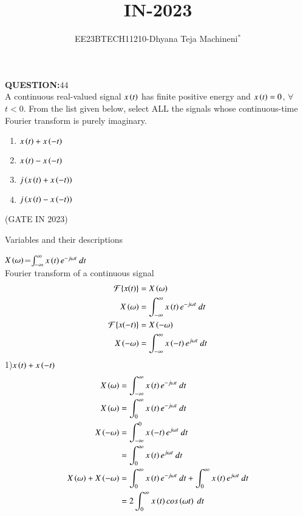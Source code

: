 \documentclass[journal,12pt,twocolumn]{IEEEtran}
\theoremstyle{remark}
\begin{document}

\vspace{3cm}
\title{\textbf{IN-2023}}
\author{EE23BTECH11210-Dhyana Teja Machineni$^{*}$%
}
\maketitle
\newpage
\bigskip

\textbf{QUESTION:$44$}\\
A continuous real-valued signal $x\left(t\right)$ has finite positive energy and $x\left(t\right) = 0$, $\forall$ $t < 0$. From the list given below, select ALL the signals whose
continuous-time Fourier transform is purely imaginary.\\
\begin{enumerate}
\item$x\left(t\right) + x\left(-t\right)$
\item$x\left(t\right) - x\left(-t\right)$
\item$j\left(x\left(t\right) + x\left(-t\right)\right)$
\item$j\left(x\left(t\right) - x\left(-t\right)\right)$
\end{enumerate}
\hfill{(GATE IN 2023)}\\
\solution
\begin{table}[h]
         \label{tab:table}
         
         \caption{Variables and their descriptions}
     \end{table}
$X\left(\omega\right)$=$\int_{-\infty}^{\infty} x\brak{t} e^{-j \omega t} \ dt$\\
Fourier transform of a continuous signal
\begin{align}
\mathcal{F}\{x(t)\} &= X\left(\omega\right)\\
   X\left(\omega\right)&=\int_{-\infty}^{\infty} x\left(t\right) e^{-j \omega t} \ dt\\
\mathcal{F}\{x(-t)\} &= X\left(-\omega \right)\\
   X\left(-\omega\right)&=\int_{-\infty}^{\infty} x\left(-t\right) e^{j \omega t} \ dt\\
\end{align}    
1)$x\left(t\right) + x\left(-t\right)$
\begin{align}
   X\brak{\omega}&=\int_{-\infty}^{\infty}x\brak{t} e^{-j \omega t} \ dt\\
   X\brak{\omega}&= \int_{0}^{\infty}x\brak{t} e^{-j \omega t} \ dt\\
   X\brak{-\omega}&= \int_{-\infty}^{0}x\brak{-t} e^{j \omega t} \ dt\\
 &=\int_{0}^{\infty}x\brak{t} e^{j\omega t} \ dt\\
 X\brak{\omega}+X\brak{-\omega}&= \int_{0}^{\infty}x\brak{t} e^{-j \omega t} \ dt+\int_{0}^{\infty}x\brak{t} e^{j \omega t} \ dt\\
 &=2 \int_{0}^{\infty} x\brak{t} cos\brak{\omega t} \ dt
\end{align}
\end{document}
